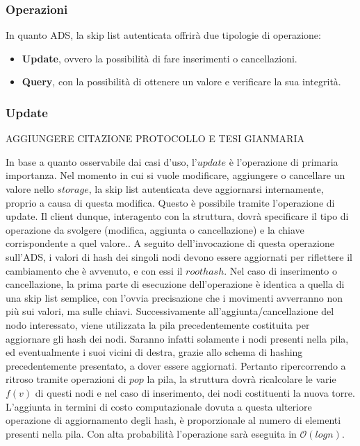 		\subsubsection{Operazioni}
		

			In quanto ADS, la skip list autenticata offrirà due tipologie di operazione:
			
			\begin{itemize}
				\item \textbf{Update}, ovvero la possibilità di fare inserimenti o cancellazioni.
				\item \textbf{Query}, con la possibilità di ottenere un valore e verificare la sua integrità.
			\end{itemize}
			
	\subsubsection{Update}
	

		{AGGIUNGERE CITAZIONE PROTOCOLLO E TESI GIANMARIA}

		In base a quanto osservabile dai casi d'uso, l'$ update $ è l'operazione di primaria importanza. Nel momento in cui si vuole modificare, aggiungere o cancellare un valore nello $ storage $, la skip list autenticata deve aggiornarsi internamente, proprio a causa di questa modifica. Questo è possibile tramite l'operazione di update. Il client dunque, interagento con la struttura, dovrà specificare il tipo di operazione da svolgere (modifica, aggiunta o cancellazione) e la chiave corrispondente a quel valore.. 
		A seguito dell'invocazione di questa operazione sull'ADS, i valori di hash dei singoli nodi devono essere aggiornati per riflettere il cambiamento che è avvenuto, e con essi il $ root hash $.
		Nel caso di inserimento o cancellazione, la prima parte di esecuzione dell'operazione è identica a quella di una skip list semplice, con l'ovvia precisazione che i movimenti avverranno non più sui valori, ma sulle chiavi. Successivamente all'aggiunta/cancellazione del nodo interessato, viene utilizzata la pila precedentemente costituita per aggiornare gli hash dei nodi. Saranno infatti solamente i nodi presenti nella pila, ed eventualmente i suoi vicini di destra, grazie allo schema di hashing precedentemente presentato, a dover essere aggiornati. Pertanto ripercorrendo a ritroso tramite operazioni di $ pop $ la pila, la struttura dovrà ricalcolare le varie $ f(v) $ di questi nodi e nel caso di inserimento, dei nodi costituenti la nuova torre.
		L'aggiunta in termini di costo computazionale dovuta a questa ulteriore operazione di aggiornamento degli hash, è proporzionale al numero di elementi presenti nella pila. Con alta probabilità l'operazione sarà eseguita in $\mathcal{O}(log{}n)$.
		
